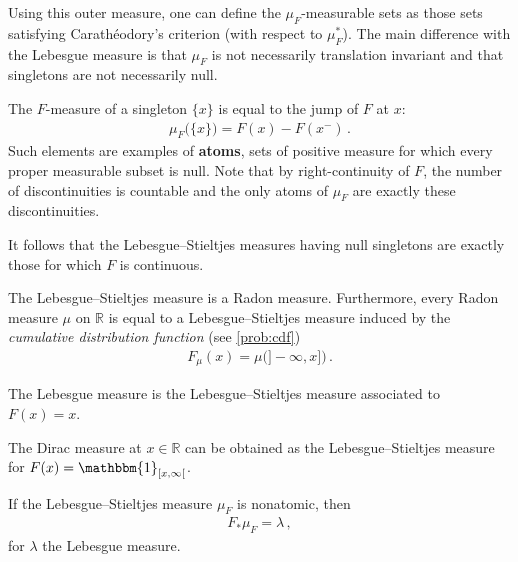     Using this outer measure, one can define the $\mu_F$-measurable sets as those sets satisfying Carath\'eodory's criterion (with respect to $\mu_F^*$). The main difference with the Lebesgue measure is that $\mu_F$ is not necessarily translation invariant and that singletons are not necessarily null.
    \begin{property}[Singletons]
        The $F$-measure of a singleton $\{x\}$ is equal to the jump of $F$ at $x$:
        \begin{gather}
            \mu_F\bigl(\{x\}\bigr) = F(x) - F(x^-)\,.
        \end{gather}
        Such elements are examples of \textbf{atoms}, sets of positive measure for which every proper measurable subset is null. Note that by right-continuity of $F$, the number of discontinuities is countable and the only atoms of $\mu_F$ are exactly these discontinuities.
    \end{property}
    \begin{result}
        It follows that the Lebesgue--Stieltjes measures having null singletons are exactly those for which $F$ is continuous.
    \end{result}

    \begin{property}[Regularity]
        The Lebesgue--Stieltjes measure is a Radon measure. Furthermore, every Radon measure $\mu$ on $\mathbb{R}$ is equal to a Lebesgue--Stieltjes measure induced by the \textit{cumulative distribution function} (see \cref{prob:cdf})
        \begin{gather}
            F_\mu(x) = \mu\bigl(]-\!\infty,x]\bigr)\,.
        \end{gather}
    \end{property}

    \begin{example}
        The Lebesgue measure is the Lebesgue--Stieltjes measure associated to $F(x)=x$.
    \end{example}
    \begin{example}
        The Dirac measure at $x\in\mathbb{R}$ can be obtained as the Lebesgue--Stieltjes measure for $F(x)=\mathbbm{1}_{[x,\infty[}$.
    \end{example}

    \begin{property}
        If the Lebesgue--Stieltjes measure $\mu_F$ is nonatomic, then
        \begin{gather}
            F_\ast\mu_F = \lambda\,,
        \end{gather}
        for $\lambda$ the Lebesgue measure.
    \end{property}

